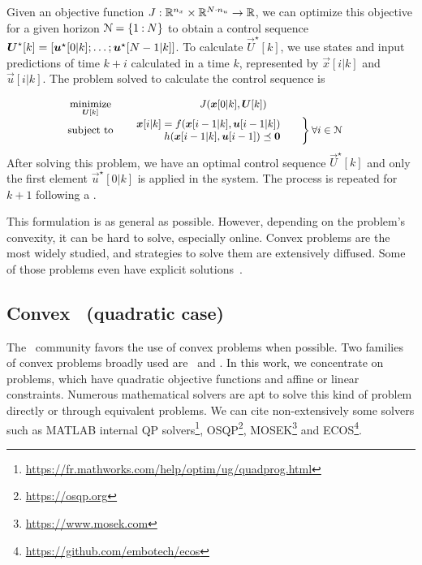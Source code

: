 \documentclass[../main.tex]{subfiles}
\begin{document}
Given an objective function ${J:\mathbb{R}^{n_{x}}\times\mathbb{R}^{N\cdot n_{u}}\to \mathbb{R}}$, we can optimize this objective for a given horizon $\mathcal{N}=\{1\mathbin{:}N\}$ to obtain a control sequence ${\boldsymbol{U}^{\star}[k]=[\boldsymbol{u}^{\star}[0|k];\dots; \boldsymbol{u}^{\star}[N-1|k]]}$. To calculate $\vec{U}^{\star}[k]$,
we use states and input predictions of time $k+i$ calculated in a time $k$, represented by $\vec{x}[i|k]$ and $\vec{u}[i|k]$. The problem solved to calculate the control sequence is

\begin{equation}\label{eq:general_mpc}
  \small
  \begin{aligned}
    \begin{matrix}
      \mathop{\textrm{minimize}}\limits_{\boldsymbol{U}[k]} & J(\boldsymbol{x}[0|k],\boldsymbol{U}[k])&\\
      \mathrm{subject~ to} &

      \left.  \begin{aligned}
          \quad \boldsymbol{x}[i|k]=f(\boldsymbol{x}[i-1|k],\boldsymbol{u}[i-1|k])\\
          \quad                h(\boldsymbol{x}[i-1|k],\boldsymbol{u}[i-1])\preceq\mathbf{0}
        \end{aligned}\qquad        \right\}

      \begin{aligned}
        \forall i\in\mathcal{N}
      \end{aligned}
    \end{matrix}
  \end{aligned}
\end{equation}
After solving this problem, we have an optimal control sequence $\vec{U}^{\star}[k]$ and only the first element $\vec{u}^{\star}[0|k]$ is applied in the system.
The process is repeated for ${k+1}$ following a \rhs.

This formulation is as general as possible.
However, depending on the problem's convexity, it can be hard to solve, especially online.
Convex problems are the most widely studied, and strategies to solve them are extensively diffused.
Some of those problems even have explicit solutions~\cite{BoydVandenberghe2004}.

\newpage
\subsection{Convex \mpc\ (quadratic case) }\label{sec:qp_mpc}
The \mpc\ community favors the use of convex problems when possible. Two families of convex problems broadly used are \qp\ and \lp.
In this work, we concentrate on \qp{} problems, which have quadratic objective functions and affine or linear constraints.
Numerous mathematical solvers are apt to solve this kind of problem directly or through equivalent problems.
We can cite non-extensively some solvers such as MATLAB internal QP solvers\footnote{\url{https://fr.mathworks.com/help/optim/ug/quadprog.html}}, OSQP\footnote{\url{https://osqp.org}}, MOSEK\footnote{\url{https://www.mosek.com}} and ECOS\footnote{\url{https://github.com/embotech/ecos}}.
\end{document}
